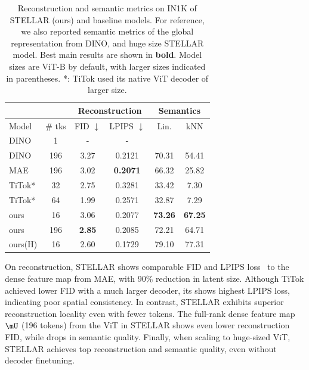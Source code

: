 \begin{table}[h]
\caption{Reconstruction and semantic metrics on IN1K of STELLAR (ours) and baseline models. For reference, we also reported semantic metrics of the global representation from DINO, and huge size STELLAR model. Best main results are shown in \textbf{bold}. Model sizes are ViT-B by default, with larger sizes indicated in parentheses. *: TiTok used its native ViT decoder of larger size.}
\label{fid-acc-table}
\begin{center}
\begin{small}
\begin{sc}
\begin{tabular}{lc|cc|cc}
\toprule
\multicolumn{2}{c}{} & \multicolumn{2}{c}{Reconstruction} & \multicolumn{2}{c}{Semantics} \\
\midrule
Model  & \# tks & FID $\downarrow$ & LPIPS $\downarrow$ & Lin. & kNN \\
\midrule
DINO & 1 & - & - & \color{gray}{76.46}& \color{gray}{74.69}\\
DINO & 196 & 3.27 & 0.2121 & 70.31 & 54.41 \\
MAE & 196 & 3.02 & \textbf{0.2071}& 66.32 & 25.82 \\
TiTok* & 32 & 2.75 & 0.3281 & 33.42 & 7.30 \\
TiTok* & 64 & 1.99 & 0.2571 & 32.87 & 7.29 \\
\midrule
ours & 16 & 3.06 & 0.2077 & \textbf{73.26}& \textbf{67.25}\\
ours & 196 & \textbf{2.85}& 0.2085 & 72.21 & 64.71 \\
ours(H)& 16 & 2.60& 0.1729& 79.10& 77.31\\
\bottomrule
\end{tabular}
\end{sc}
\end{small}
\end{center}
\vskip -0.1in
\end{table}

On reconstruction, STELLAR shows comparable FID and LPIPS loss~\cite{zhang2018unreasonable} to the dense feature map from MAE, with 90\% reduction in latent size. Although TiTok achieved lower FID with a much larger decoder, its shows highest LPIPS loss, indicating poor spatial consistency. In contrast, STELLAR exhibits superior reconstruction locality even with fewer tokens. The full-rank dense feature map $\mU$ (196 tokens) from the ViT in STELLAR shows even lower reconstruction FID, while drops in semantic quality. Finally, when scaling to huge-sized ViT, STELLAR achieves top reconstruction and semantic quality, even without decoder finetuning.

